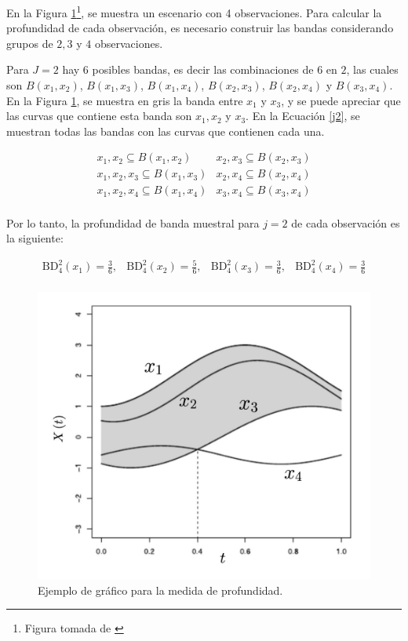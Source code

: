 \begin{ejemplo}
   En la Figura \ref{fig:CurvasX}\footnote{
Figura tomada de \cite{boxplotFun}}, se muestra un escenario con 4 observaciones. Para calcular la profundidad de cada observación, es necesario construir las bandas considerando grupos de $2, 3$ y $4$ observaciones.
    
    Para $J = 2$ hay $6$ posibles bandas, es decir las combinaciones de $6$ en $2$, las cuales son $B(x_1, x_2)$, $B(x_1, x_3)$, $B(x_1, x_4)$, $B(x_2, x_3)$, $B(x_2, x_4)$ y $B(x_3, x_4)$. En la Figura \ref{fig:CurvasX}, se muestra en gris la banda entre $x_1$ y $x_3$, y se puede apreciar que las curvas que contiene esta banda son $x_1, x_2$ y $x_3$. En la Ecuación \eqref{j2}, se muestran todas las bandas con las curvas que contienen cada una.
    
    \begin{equation}\label{j2}
        \begin{matrix}
        x_1,x_2 \subseteq  B(x_1, x_2)  & x_2,x_3 \subseteq  B(x_2, x_3) \\
        x_1,x_2, x_3 \subseteq  B(x_1, x_3)  & x_2,x_4 \subseteq  B(x_2, x_4) \\
        x_1,x_2, x_4 \subseteq  B(x_1, x_4)  & x_3,x_4 \subseteq  B(x_3, x_4) \\
    \end{matrix}
    \end{equation}

    Por lo tanto, la profundidad de banda muestral para $j = 2$ de cada observación es la siguiente:

    \begin{equation}
        \begin{matrix}
            \mathrm{BD}^{2}_4(x_1) = \frac{3}{6}, & \mathrm{BD}^{2}_4(x_2) = \frac{5}{6},  & \mathrm{BD}^{2}_4(x_3) = \frac{3}{6},  & \mathrm{BD}^{2}_4(x_4) = \frac{3}{6} \\
        \end{matrix}        
    \end{equation}
    
    \begin{figure}[H]
    \centering
    \includegraphics[width = 0.7 \textwidth]{Imagenes/WhatsApp Image 2024-04-21 at 8.06.25 PM.jpeg}
    \caption{Ejemplo de gráfico para la medida de profundidad.}
    \label{fig:CurvasX}
\end{figure}


\end{ejemplo}

